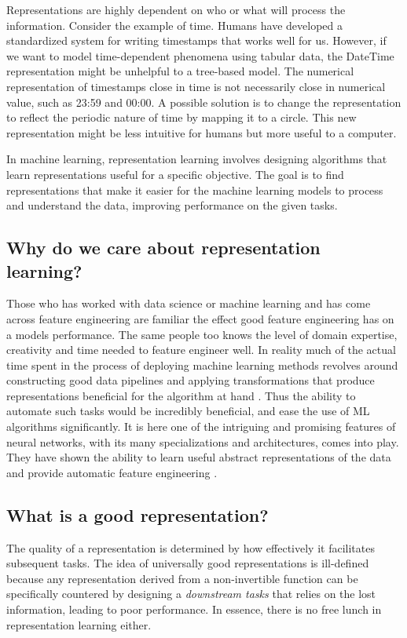 \documentclass[../../thesis.tex]{subfiles}
\begin{document}
Representations are highly dependent on who or what will process the information. Consider the example of time. Humans have developed a standardized system for writing timestamps that works well for us. However, if we want to model time-dependent phenomena using tabular data, the DateTime representation might be unhelpful to a tree-based model. The numerical representation of timestamps close in time is not necessarily close in numerical value, such as 23:59 and 00:00. A possible solution is to change the representation to reflect the periodic nature of time by mapping it to a circle. This new representation might be less intuitive for humans but more useful to a computer.\newline

In machine learning, representation learning involves designing algorithms that learn representations useful for a specific objective. The goal is to find representations that make it easier for the machine learning models to process and understand the data, improving performance on the given tasks.

\subsection{Why do we care about representation learning?}
Those who has worked with data science or machine learning and has come across feature engineering are familiar the effect good feature engineering has on a models performance. The same people too knows the level of domain expertise, creativity and time needed to feature engineer well. In reality much of the actual time spent in the process of deploying machine learning methods revolves around constructing good data pipelines and applying transformations that produce representations beneficial for the algorithm at hand \cite{Rep-rev-persp}. Thus the ability to automate such tasks would be incredibly beneficial, and ease the use of ML algorithms significantly. It is here one of the intriguing and promising features of neural networks, with its many specializations and architectures, comes into play. They have shown the ability to learn useful abstract representations of the data and provide automatic feature engineering \cite{Rep-rev-persp}. 


\subsection{What is a good representation?}

The quality of a representation is determined by how effectively it facilitates subsequent tasks. The idea of universally good representations is ill-defined because any representation derived from a non-invertible function can be specifically countered by designing a \textit{downstream tasks} that relies on the lost information, leading to poor performance. In essence, there is no free lunch in representation learning either.\newline
\end{document}
